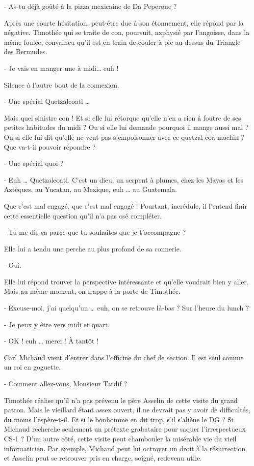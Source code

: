 - As-tu déjà goûté à la pizza mexicaine de Da Peperone ?

Après une courte hésitation, peut-être due à son étonnement, elle répond par la négative. Timothée qui se traite de con, poursuit, axphysié par l’angoisse, dans la même foulée, convaincu qu’il est en train de couler à pic au-dessus du Triangle des Bermudes.

- Je vais en manger une à midi… euh !

Silence à l’autre bout de la connexion.

- Une spécial Quetzalcoatl …

Mais quel sinistre con ! Et si elle lui rétorque qu’elle n’en a rien à foutre de ses petites habitudes du midi ? Ou si elle lui demande pourquoi il mange aussi mal ? Ou si elle lui dit qu’elle ne veut pas s’empoisonner avec ce quetzal coa machin ? Que va-t-il pouvoir répondre ?

- Une spécial quoi ?

- Euh … Quetzalcoatl. C’est un dieu, un serpent à plumes, chez les Mayas et les Aztèques, au Yucatan, au Mexique, euh … au Guatemala.

Que c’est mal engagé, que c’est mal engagé ! Pourtant, incrédule, il l’entend finir cette essentielle question qu’il n’a pas osé compléter.

- Tu me dis ça parce que tu souhaites que je t’accompagne ?

Elle lui a tendu une perche au plus profond de sa connerie.

- Oui.

Elle lui répond trouver la perspective intéressante et qu’elle voudrait bien y aller. Mais au même moment, on frappe à la porte de Timothée.

- Excuse-moi, j’ai quelqu’un … euh, on se retrouve là-bas ? Sur l’heure du lunch ?

- Je peux y être vers midi et quart.

- OK ! euh … merci ! À tantôt !

Carl Michaud vient d’entrer dans l’officine du chef de section. Il est seul comme un roi en goguette.

- Comment allez-vous, Monsieur Tardif ?

Timothée réalise qu’il n’a pas prévenu le père Asselin de cette visite du grand patron. Mais le vieillard étant assez ouvert, il ne devrait pas y avoir de difficultés, du moins l’espère-t-il. Et si le bonhomme en dit trop, s’il s’aliène le DG ? Si Michaud recherche seulement un prétexte grabataire pour saquer l’irrespectueux CS-1 ? D’un autre côté, cette visite peut chambouler la misérable vie du vieil informaticien. Par exemple, Michaud peut lui octroyer un droit à la résurrection et Asselin peut se retrouver pris en charge, soigné, redevenu utile.

